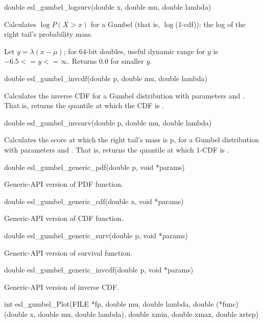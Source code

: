 \begin{sreapi}
\hypertarget{func:esl_gumbel_logsurv()}
{\item[double esl\_gumbel\_logsurv(double x, double mu, double lambda)]}

Calculates $\log P(X>x)$ for a Gumbel (that is, $\log$(1-cdf)):
the log of the right tail's probability mass.

Let $y=\lambda(x-\mu)$; for 64-bit doubles, 
useful dynamic range for $y$ is $-6.5 <= y <= \infty$.
Returns 0.0 for smaller $y$.


\hypertarget{func:esl_gumbel_invcdf()}
{\item[double esl\_gumbel\_invcdf(double p, double mu, double lambda)]}

Calculates the inverse CDF for a Gumbel distribution
with parameters  and . That is, returns
the quantile  at which the CDF is .


\hypertarget{func:esl_gumbel_invsurv()}
{\item[double esl\_gumbel\_invsurv(double p, double mu, double lambda)]}

Calculates the score at which the right tail's mass
is p, for a Gumbel distribution
with parameters  and . That is, returns
the quantile  at which 1-CDF is .


\hypertarget{func:esl_gumbel_generic_pdf()}
{\item[double esl\_gumbel\_generic\_pdf(double p, void *params)]}

Generic-API version of PDF function.


\hypertarget{func:esl_gumbel_generic_cdf()}
{\item[double esl\_gumbel\_generic\_cdf(double x, void *params)]}

Generic-API version of CDF function.


\hypertarget{func:esl_gumbel_generic_surv()}
{\item[double esl\_gumbel\_generic\_surv(double p, void *params)]}

Generic-API version of survival function.


\hypertarget{func:esl_gumbel_generic_invcdf()}
{\item[double esl\_gumbel\_generic\_invcdf(double p, void *params)]}

Generic-API version of inverse CDF.


\hypertarget{func:esl_gumbel_Plot()}
{\item[int esl\_gumbel\_Plot(FILE *fp, double mu, double lambda, 
		double (*func)(double x, double mu, double lambda), 
		double xmin, double xmax, double xstep)]}


\end{sreapi}

